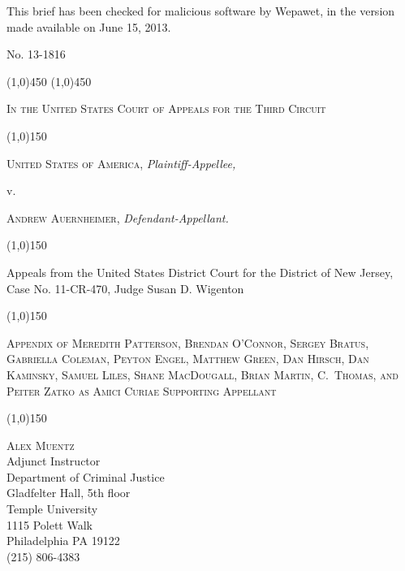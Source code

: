 \documentclass{article}
\begin{document}
	This brief has been checked for malicious software by Wepawet, in the version made available on June 15, 2013.
	
\newpage

	\singlespace
	\fontsize{14}{17}
	\selectfont
	\thispagestyle{empty} %
	\begin{center}
		
		No. 13-1816
		
		\linethickness{0.5mm}
		\line(1,0){450}
		\vspace{-0.9em}
		\linethickness{0.25mm}
		\line(1,0){450}
		\vspace{0.20in}
		
		\textsc{In the United States Court of Appeals for the Third Circuit}
		\vspace{0.20in}
		
		\line(1,0){150}
		
		\vspace{0.20in}
		\textsc{United States of America,}
		\vspace{0.20in}
		\emph{Plaintiff-Appellee,}
		\vspace{0.05in}
		
		v.
		
		\vspace{0.20in}
		\textsc{Andrew Auernheimer,}
		\vspace{0.20in}
		\emph{Defendant-Appellant.}
		
		\line(1,0){150}
		
		\vspace{0.20in}
		Appeals from the United States District Court for the District of New Jersey, Case No. 11-CR-470, Judge Susan D. Wigenton
		\vspace{0.20in}
		
		\line(1,0){150}
		
		\vspace{0.20in}
		\textsc{Appendix of Meredith Patterson, Brendan O'Connor, Sergey Bratus, Gabriella Coleman, Peyton Engel, Matthew Green, Dan Hirsch, Dan Kaminsky, Samuel Liles, Shane MacDougall, Brian Martin, C.\ Thomas, and Peiter Zatko as Amici Curiae Supporting Appellant}
		\vspace{0.20in}
		
		\line(1,0){150}
		
		\vspace{0.20in}
		\textsc{Alex Muentz} \\
		Adjunct Instructor \\
		Department of Criminal Justice \\
		Gladfelter Hall, 5th floor \\
		Temple University \\ 
		1115 Polett Walk \\
		Philadelphia PA 19122 \\
		(215) 806-4383 \\
		\vspace{0.20in}


\end{center}
\end{document}
